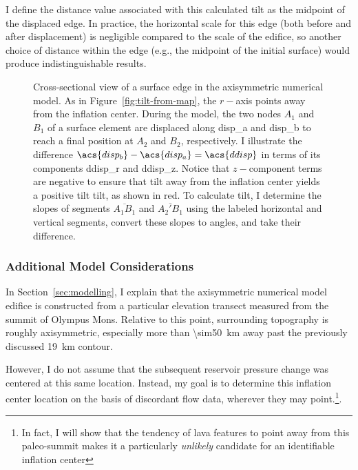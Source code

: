I define the distance value associated with this calculated tilt as the midpoint of the displaced edge. In practice, the horizontal scale for this edge (both before and after displacement) is negligible compared to the scale of the edifice, so another choice of distance within the edge (e.g., the midpoint of the initial surface) would produce indistinguishable results.

\begin{figure}
    \caption[Tilt from numerical modelling]{Cross-sectional view of a surface edge in the axisymmetric numerical model. As in Figure~\ref{fig:tilt-from-map}, the $r-$axis points away from the inflation center. During the model, the two nodes $A_1$ and $B_1$ of a surface element are displaced along \acs{disp_a} and \acs{disp_b} to reach a final position at $A_2$ and $B_2$, respectively. I illustrate the difference $\acs{disp_b} - \acs{disp_a} = \acs{ddisp}$ in terms of its components \acs{ddisp_r} and \acs{ddisp_z}. Notice that $z-$component terms are negative to ensure that tilt away from the inflation center yields a positive tilt \acs{tilt}, as shown in red. To calculate \acs{tilt}, I determine the slopes of segments $\overline{A_1B_1}$ and $\overline{A_2'B_1}$ using the labeled horizontal and vertical segments, convert these slopes to angles, and take their difference.}%
    \label{fig:tilt-from-model}%
\end{figure}

\subsubsection{Additional Model Considerations}

In Section~\ref{sec:modelling}, I explain that the axisymmetric numerical model edifice is constructed from a particular elevation transect measured from the summit of Olympus Mons. Relative to this point, surrounding topography is roughly axisymmetric, especially more than \qty{\sim50}{\km} away past the previously discussed \qty{19}{\km} contour.

However, I do not assume that the subsequent reservoir pressure change was centered at this same location. Instead, my goal is to  determine this inflation center location on the basis of discordant flow data, wherever they may point.\footnote{In fact, I will show that the tendency of lava features to point away from this paleo-summit makes it a particularly \emph{unlikely} candidate for an identifiable inflation center}.

